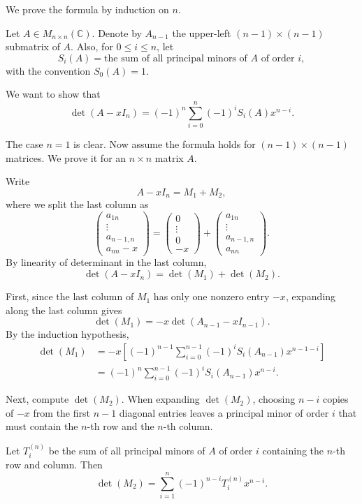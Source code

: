 \begin{pfbox}
We prove the formula by induction on $n$.

Let $A\in M_{n\times n}(\mathbb{C})$. Denote by $A_{n-1}$ the upper-left
$(n-1)\times(n-1)$ submatrix of $A$. Also, for $0\le i\le n$, let
\[
S_i(A)
=
\text{the sum of all principal minors of } A \text{ of order } i,
\]
with the convention $S_0(A)=1$.

We want to show that
\[
\det(A-xI_n)
=
(-1)^n
\sum_{i=0}^n
(-1)^i S_i(A)x^{n-i}.
\]

The case $n=1$ is clear. Now assume the formula holds for $(n-1)\times(n-1)$
matrices. We prove it for an $n\times n$ matrix $A$.

Write
\[
A-xI_n=M_1+M_2,
\]
where we split the last column as
\[
\begin{pmatrix}
a_{1n}\\
\vdots\\
a_{n-1,n}\\
a_{nn}-x
\end{pmatrix}
=
\begin{pmatrix}
0\\
\vdots\\
0\\
-x
\end{pmatrix}
+
\begin{pmatrix}
a_{1n}\\
\vdots\\
a_{n-1,n}\\
a_{nn}
\end{pmatrix}.
\]
By linearity of determinant in the last column,
\[
\det(A-xI_n)=\det(M_1)+\det(M_2).
\]

First, since the last column of $M_1$ has only one nonzero entry $-x$, expanding
along the last column gives
\[
\det(M_1)
=
-x\det(A_{n-1}-xI_{n-1}).
\]
By the induction hypothesis,
\begin{align*}
\det(M_1)
&=
-x
\left[
(-1)^{n-1}
\sum_{i=0}^{n-1}
(-1)^i S_i(A_{n-1})x^{n-1-i}
\right] \\
&=
(-1)^n
\sum_{i=0}^{n-1}
(-1)^i S_i(A_{n-1})x^{n-i}.
\end{align*}

Next, compute $\det(M_2)$. When expanding $\det(M_2)$, choosing $n-i$ copies
of $-x$ from the first $n-1$ diagonal entries leaves a principal minor of order
$i$ that must contain the $n$-th row and the $n$-th column.

Let $T_i^{(n)}$ be the sum of all principal minors of $A$ of order $i$ containing the $n$-th row and column. Then
\[
\det(M_2)
=
\sum_{i=1}^n
(-1)^{n-i}T_i^{(n)}x^{n-i}.
\]


\end{pfbox}
